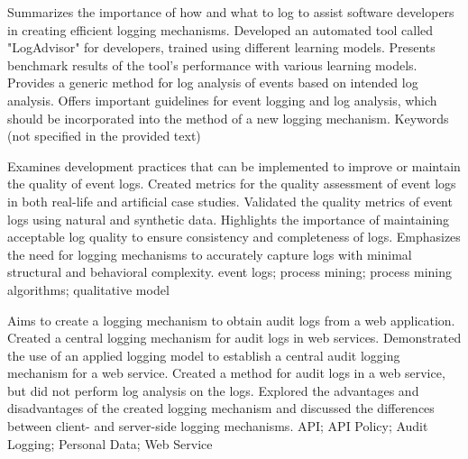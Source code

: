 {
    Summarizes the importance of how and what to log to assist software developers in creating efficient logging mechanisms.
}
{
    Developed an automated tool called "LogAdvisor" for developers, trained using different learning models.
}
{
    Presents benchmark results of the tool's performance with various learning models.
}
{
    Provides a generic method for log analysis of events based on intended log analysis. Offers important guidelines for event logging and log analysis, which should be incorporated into the method of a new logging mechanism.
}
{
    Keywords (not specified in the provided text)
}

{
    Examines development practices that can be implemented to improve or maintain the quality of event logs.
}
{
    Created metrics for the quality assessment of event logs in both real-life and artificial case studies.
}
{
    Validated the quality metrics of event logs using natural and synthetic data.
}
{
    Highlights the importance of maintaining acceptable log quality to ensure consistency and completeness of logs. Emphasizes the need for logging mechanisms to accurately capture logs with minimal structural and behavioral complexity.
}
{
    event logs; process mining; process mining algorithms; qualitative model
}

{
    Aims to create a logging mechanism to obtain audit logs from a web application.
}
{
    Created a central logging mechanism for audit logs in web services.
}
{
    Demonstrated the use of an applied logging model to establish a central audit logging mechanism for a web service.
}
{
    Created a method for audit logs in a web service, but did not perform log analysis on the logs. Explored the advantages and disadvantages of the created logging mechanism and discussed the differences between client- and server-side logging mechanisms.
}
{
    API; API Policy; Audit Logging; Personal Data; Web Service
}

